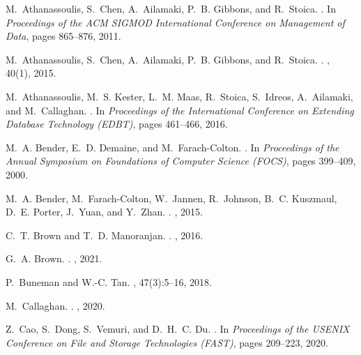 \documentclass[11pt,dvipdfmx]{article}
\begin{document}
\begin{thebibliography}{10}
\begin{small}
  M.~Athanassoulis, S.~Chen, A.~Ailamaki, P.~B. Gibbons, and R.~Stoica.
  .
  \newblock In {\em Proceedings of the ACM SIGMOD International Conference on
    Management of Data}, pages 865--876, 2011.
  
  M.~Athanassoulis, S.~Chen, A.~Ailamaki, P.~B. Gibbons, and R.~Stoica.
  .
  , 40(1), 2015.
  
  M.~Athanassoulis, M.~S. Kester, L.~M. Maas, R.~Stoica, S.~Idreos, A.~Ailamaki,
    and M.~Callaghan.
  .
  \newblock In {\em Proceedings of the International Conference on Extending
    Database Technology (EDBT)}, pages 461--466, 2016.
  
  M.~A. Bender, E.~D. Demaine, and M.~Farach-Colton.
  .
  \newblock In {\em Proceedings of the Annual Symposium on Foundations of
    Computer Science (FOCS)}, pages 399--409, 2000.
  
  M.~A. Bender, M.~Farach-Colton, W.~Jannen, R.~Johnson, B.~C. Kuszmaul, D.~E.
    Porter, J.~Yuan, and Y.~Zhan.
  .
  , 2015.
  
  C.~T. Brown and T.~D. Manoranjan.
  .
  ,
    2016.
  
  G.~A. Brown.
  .
  ,
    2021.
  
  P.~Buneman and W.-C. Tan.
  , 47(3):5--16, 2018.
  
  M.~Callaghan.
  .
  ,
    2020.
  
  Z.~Cao, S.~Dong, S.~Vemuri, and D.~H.~C. Du.
  .
  \newblock In {\em Proceedings of the USENIX Conference on File and Storage
    Technologies (FAST)}, pages 209--223, 2020.
  

\end{small}
\end{thebibliography}
\end{document}
